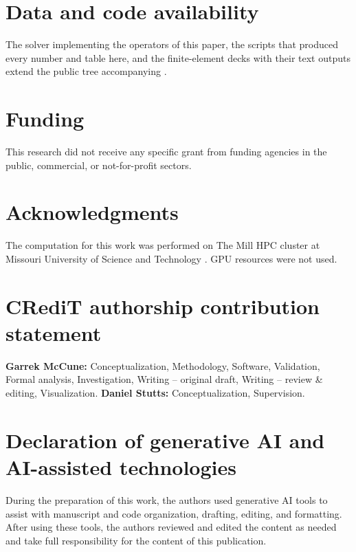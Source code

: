 \documentclass[11pt]{article}
\begin{document}
\section*{Data and code availability}
The solver implementing the operators of this paper, the scripts that
produced every number and table here, and the finite-element decks with
their text outputs extend the public tree accompanying
\cite{mccune2026ring}.

\section*{Funding}
This research did not receive any specific grant from funding agencies in the
public, commercial, or not-for-profit sectors.

\section*{Acknowledgments}
The computation for this work was performed on The Mill HPC cluster at
Missouri University of Science and Technology \cite{mill2024}. GPU resources
were not used.

\section*{CRediT authorship contribution statement}
\textbf{Garrek McCune:} Conceptualization, Methodology, Software, Validation,
Formal analysis, Investigation, Writing -- original draft, Writing -- review \&
editing, Visualization. \textbf{Daniel Stutts:} Conceptualization,
Supervision.

\section*{Declaration of generative AI and AI-assisted technologies}
During the preparation of this work, the authors used generative AI tools to
assist with manuscript and code organization, drafting, editing, and
formatting. After using these tools, the authors reviewed and edited the
content as needed and take full responsibility for the content of this
publication.
\normalsize
\end{document}
